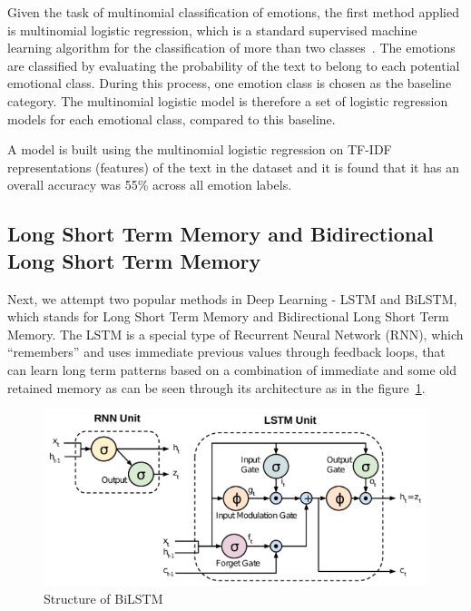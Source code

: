\documentclass[11pt]{article}
\begin{document}
Given the task of multinomial classification of emotions, the first method applied is multinomial logistic regression, which is a standard supervised machine learning algorithm for the classification of more than two classes~\cite{textbook}. The emotions are classified by evaluating the probability of the text to belong to each potential emotional class. During this process, one emotion class is chosen as the baseline category. The multinomial logistic model is therefore a set of logistic regression models for each emotional class, compared to this baseline.

A model is built using the multinomial logistic regression on TF-IDF representations (features) of the text in the dataset and it is found that it has an overall accuracy was 55\% across all emotion labels.

\subsection{Long Short Term Memory and Bidirectional Long Short Term Memory}
\label{sect:BiLSTM}

Next, we attempt two popular methods in Deep Learning - LSTM and BiLSTM, which stands for Long Short Term Memory and Bidirectional Long Short Term Memory. The LSTM is a special type of Recurrent Neural Network (RNN), which  “remembers” and uses immediate previous values through feedback loops, that can learn long term patterns based on a combination of immediate and some old retained memory as can be seen through its architecture as in the figure~\ref{fig:bt}.

\begin{figure}
\caption{Structure of BiLSTM}
\label{fig:bt}
\centering
\includegraphics[scale=0.4]{images/BiLSTM.png}
\end{figure}
\end{document}
